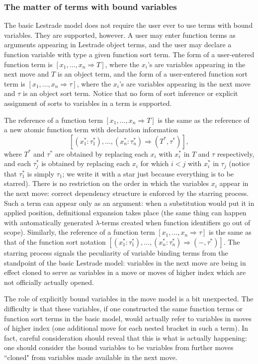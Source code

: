 \documentclass{article}
\begin{document}
\subsubsection{The matter of terms with bound variables}

The basic Lestrade model does not require the user ever to use terms with bound variables.  They are supported, however.   A user may enter function terms as arguments appearing in Lestrade object terms, and the user may declare a function variable with type a given function sort term.  The form of a user-entered function term is $[x_1,\ldots,x_n \Rightarrow T]$, where the $x_i$'s are variables appearing in the next move and $T$ is an object term, and the form of a user-entered function sort term is $[x_1,\ldots,x_n \Rightarrow \tau]$, where the
$x_i$'s are variables appearing in the next move and $\tau$ is an object sort term.  Notice that no form of sort inference or explicit assignment of sorts to variables in a term  is supported. 

The reference of a function term  $[x_1,\ldots,x_n \Rightarrow T]$ is the same as the reference of a new atomic function term with
declaration information $$[(x_1^*:\tau_1^*),\ldots,(x_n^*:\tau_n^*)\Rightarrow (T^*,\tau^*)],$$ where $T^*$ and $\tau^*$ are obtained by
replacing each $x_i$ with $x_i^*$ in $T$ and $\tau$ respectively, and each $\tau_j^*$ is obtained by replacing each $x_i$ for which $i<j$ with $x_i^*$ in $\tau_j$ (notice that $\tau_1^*$ is simply $\tau_1$;  we write it with a star just because everything is to be starred).  There is no restriction on the order in which the variables $x_i$ appear in the next move:  correct dependency structure is enforced by the starring process. Such a term can appear only as an argument:  when a substitution would put it in applied position, definitional expansion takes place (the same thing can happen with automatically generated $\lambda$-terms created when function identifiers go out of scope).  Similarly,  the reference of a function term  $[x_1,\ldots,x_n \Rightarrow \tau]$ is the same as that of the function sort notation $[(x_1^*:\tau_1^*),\ldots,(x_n^*:\tau_n^*)\Rightarrow (-,\tau^*)]$.
The starring process signals the peculiarity of variable binding terms from the standpoint of the basic Lestrade model:  variables in the next move are being in effect cloned to serve as variables in a move or moves of higher index which are not officially actually opened.

The role of explicitly bound variables in the move model is a bit unexpected.  The difficulty is that these variables, if one constructed the same function terms or function sort terms in the basic model, would actually refer to variables in moves of higher index (one additional move for each nested bracket in such a term).  In fact, careful consideration should reveal that this is what is actually happening:  one should consider the bound variables to be variables from further moves ``cloned" from variables made available in the next move.
\end{document}
